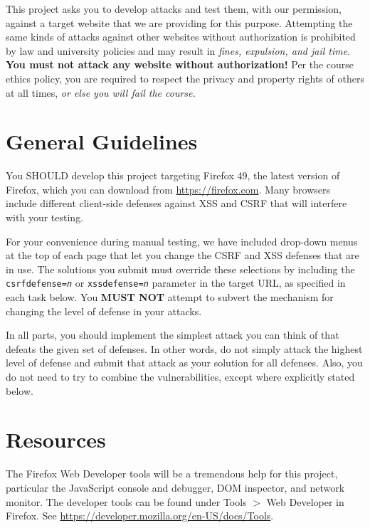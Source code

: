 \documentclass[letterpaper,12pt]{report}
\newcommand{\firefox}{Firefox 49}
\begin{document}
This project asks you to develop attacks and test them, with our permission, against a target website that we are providing for this purpose.  Attempting the same kinds of attacks against other websites without authorization is prohibited by law and university policies and may result in \emph{fines, expulsion, and jail time}.   \textbf{You must not attack any website without authorization!}  Per the course ethics policy, you are required to respect the privacy and  property rights of others at all times, \emph{or else you will fail the course.}  


\section*{General Guidelines}

You SHOULD develop this project targeting \firefox, the latest version of Firefox, which you can download from \url{https://firefox.com}.  Many browsers include different client-side defenses against XSS and CSRF that will interfere with your testing.

\medskip

For your convenience during manual testing, we have included drop-down menus at the top of each page that let you change the CSRF and XSS defenses that are in use.  The solutions you submit must override these selections by including the \texttt{csrfdefense=\emph{n}} or \texttt{xssdefense=\emph{n}} parameter in the target URL, as specified in each task below.  You \textbf{MUST NOT} attempt to subvert the mechanism for changing the level of defense in your attacks.

\medskip

In all parts, you should implement the simplest attack you can think of that defeats the given set of defenses. In other words, do not simply attack the highest level of defense and submit that attack as your solution for all defenses. Also, you do not need to try to combine the vulnerabilities, except where explicitly stated below.

\section*{Resources} 
\label{sec:resources}

The Firefox Web Developer tools will be a tremendous help for this project, particular the JavaScript console and debugger, DOM inspector, and network monitor.  The developer tools can be found under Tools $>$ Web Developer in Firefox.  See \url{https://developer.mozilla.org/en-US/docs/Tools}.
\end{document}
